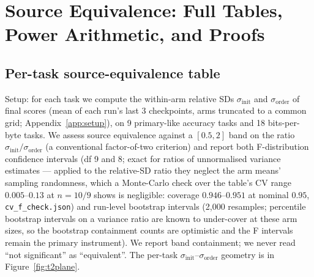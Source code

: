 
\section{Source Equivalence: Full Tables, Power Arithmetic, and Proofs}
\label{app:t2}

\subsection{Per-task source-equivalence table}
\label{app:t2-table}


Setup: for each task we compute the within-arm relative SDs $\sigma_{\mathrm{init}}$ and
$\sigma_{\mathrm{order}}$ of final scores (mean of each run's last 3 checkpoints, arms truncated
to a common grid; Appendix~\ref{app:setup}), on 9 primary-like accuracy tasks and 18
bits-per-byte tasks. We assess source equivalence against a $[0.5, 2]$ band on the ratio
$\sigma_{\mathrm{init}}/\sigma_{\mathrm{order}}$ (a conventional factor-of-two
criterion) and report both F-distribution confidence
intervals (df 9 and 8; exact for ratios of unnormalised variance estimates --- applied to the
relative-SD ratio they neglect the arm means' sampling randomness, which a Monte-Carlo check
over the table's CV range $0.005$--$0.13$ at $n = 10/9$ shows is negligible: coverage
$0.946$--$0.951$ at nominal $0.95$, \texttt{cv\_f\_check.json}) and run-level bootstrap intervals (2{,}000 resamples; percentile
bootstrap intervals on a variance ratio are known to under-cover at these arm sizes, so the
bootstrap containment counts are optimistic and the F intervals remain the primary
instrument). We report band
containment; we never read ``not significant'' as ``equivalent''. The per-task
$\sigma_{\mathrm{init}}$--$\sigma_{\mathrm{order}}$ geometry is in Figure~\ref{fig:t2plane}.

